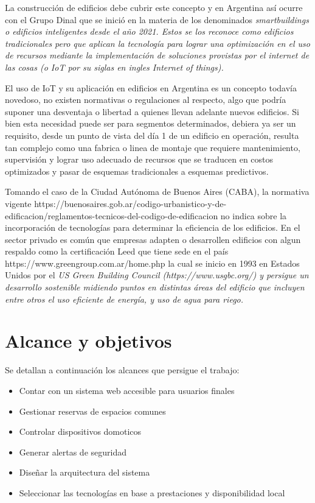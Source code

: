 La construcción de edificios debe cubrir este concepto y en Argentina así ocurre con el Grupo Dinal que se inició en la materia de los denominados \it{smartbuildings} o edificios inteligentes desde el año 2021. Estos se los reconoce como edificios tradicionales pero que aplican la tecnología para lograr una optimización en el uso de recursos mediante la implementación de soluciones provistas por el internet de las cosas (o IoT por su siglas en ingles Internet of things).

El uso de IoT y su aplicación en edificios en Argentina es un concepto todavía novedoso, no existen normativas o regulaciones al respecto, algo que podría suponer una desventaja o libertad a quienes llevan adelante nuevos edificios. Si bien esta necesidad puede ser para segmentos determinados, debiera ya ser un requisito, desde un punto de vista del día 1 de un edificio en operación, resulta tan complejo como una fabrica o linea de montaje que requiere mantenimiento, supervisión y lograr uso adecuado de recursos que se traducen en costos optimizados y pasar de esquemas tradicionales a esquemas predictivos.

Tomando el caso de la Ciudad Autónoma de Buenos Aires (CABA), la normativa vigente https://buenosaires.gob.ar/codigo-urbanistico-y-de-edificacion/reglamentos-tecnicos-del-codigo-de-edificacion 
no indica sobre la incorporación de tecnologías para determinar la eficiencia de los edificios.
En el sector privado es común que empresas adapten o desarrollen edificios con algun respaldo como la certificación Leed que tiene sede en el país https://www.greengroup.com.ar/home.php la cual se inicio en 1993 en Estados Unidos por el \it{US Green Building Council} (https://www.usgbc.org/) y persigue un desarrollo sostenible midiendo puntos en distintas áreas del edificio que incluyen entre otros el uso eficiente de energía, y uso de agua para riego.


\section{Alcance y objetivos}

Se detallan a continuación los alcances que persigue el trabajo:

\begin{itemize}
\item Contar con un sistema web accesible para usuarios finales	
\item Gestionar reservas de espacios comunes
\item Controlar dispositivos domoticos
\item Generar alertas de seguridad
\item Diseñar la arquitectura del sistema
\item Seleccionar las tecnologías en base a prestaciones y disponibilidad local

\end{itemize}




